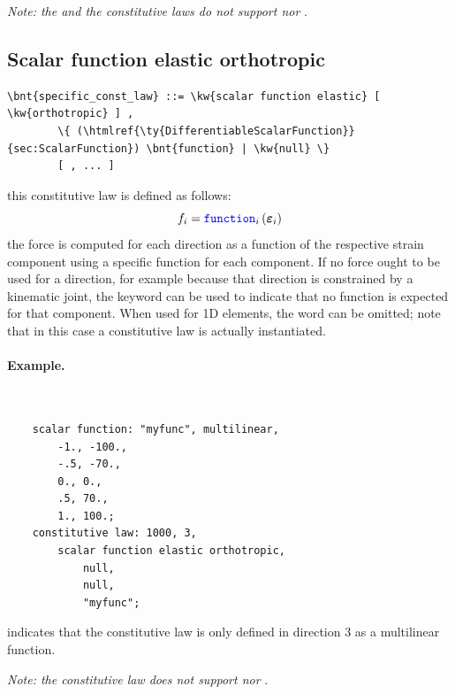 \bigskip
\noindent
\emph{Note: the  and the  constitutive laws do not support  nor }.

\subsection{Scalar function elastic orthotropic}
\begin{Verbatim}[commandchars=\\\{\}]
    \bnt{specific_const_law} ::= \kw{scalar function elastic} [ \kw{orthotropic} ] ,
        \{ (\htmlref{\ty{DifferentiableScalarFunction}}{sec:ScalarFunction}) \bnt{function} | \kw{null} \}
        [ , ... ]
\end{Verbatim}
this constitutive law is defined as follows:
\begin{displaymath}
	f_i = \textcolor{blue}{\texttt{function}}_i \left( \boldsymbol{\varepsilon}_i \right)
\end{displaymath}
the force is computed for each direction as a function of the respective
strain component using a specific function for each component.
If no force ought to be used for a direction, for example because 
that direction is constrained by a kinematic joint, the keyword 
can be used to indicate that no function is expected for that component.
When used for 1D elements, the word  can be omitted;
note that in this case a 
constitutive law is actually instantiated.

\paragraph{Example.} \
\begin{verbatim}
    scalar function: "myfunc", multilinear,
        -1., -100.,
        -.5, -70.,
        0., 0.,
        .5, 70.,
        1., 100.;
    constitutive law: 1000, 3,
        scalar function elastic orthotropic,
            null,
            null,
            "myfunc";
\end{verbatim}
indicates that the constitutive law is only defined in direction 3 
as a multilinear function.

\bigskip
\noindent
\emph{Note: the  constitutive law does not support  nor }.

